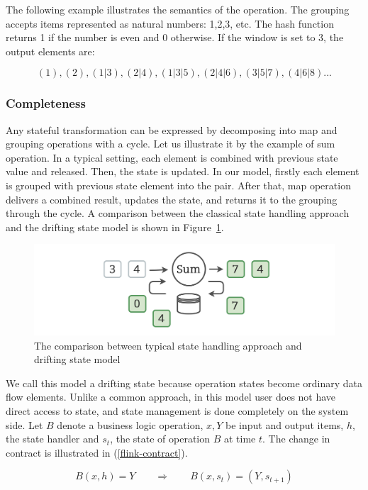 The following example illustrates the semantics of the operation. The grouping accepts items represented as natural numbers: 1,2,3, etc. The hash function returns 1 if the number is even and 0 otherwise. If the window is set to 3, the output elements are:

\[(1), (2), (1|3), (2|4), (1|3|5), (2|4|6), (3|5|7), (4|6|8)...\]

\subsubsection{Completeness}

Any stateful transformation can be expressed by decomposing into map and grouping operations with a cycle. Let us illustrate it by the example of sum operation. In a typical setting, each element is combined with previous state value and released. Then, the state is updated. In our model, firstly each element is grouped with previous state element into the pair. After that, map operation delivers a combined result, updates the state, and returns it to the grouping through the cycle. A comparison between the classical state handling approach and the drifting state model is shown in Figure~\ref{classical-drifting}.

\begin{figure}[htbp]
  \centering
  \includegraphics[width=.49\textwidth]{pics/classical-drifting}
  \caption{The comparison between typical state handling approach and drifting state model}
  \label {classical-drifting}
\end{figure}

We call this model a drifting state because operation states become ordinary data flow elements. Unlike a common approach, in this model user does not have direct access to state, and state management is done completely on the system side. Let $B$ denote a business logic operation, $x, Y$ be input and output items, $h$, the state handler and $s_t$, the state of operation $B$ at time $t$. The change in contract is illustrated in (\ref{flink-contract}).

\begin{equation}
  \label{flink-contract}
  B(x, h) = Y \qquad\Longrightarrow\qquad B(x, s_{t}) = (Y, s_{t+1}) 
\end{equation}

